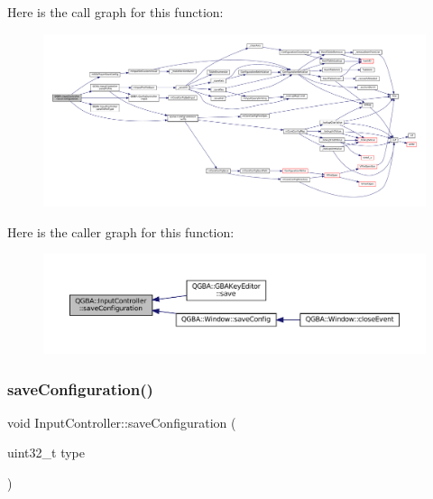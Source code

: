 Here is the call graph for this function\+:
\nopagebreak
\begin{figure}[H]
\begin{center}
\leavevmode
\includegraphics[width=350pt]{class_q_g_b_a_1_1_input_controller_a2adb9fc74465b49f0730fdcf034e05bd_cgraph}
\end{center}
\end{figure}
Here is the caller graph for this function\+:
\nopagebreak
\begin{figure}[H]
\begin{center}
\leavevmode
\includegraphics[width=350pt]{class_q_g_b_a_1_1_input_controller_a2adb9fc74465b49f0730fdcf034e05bd_icgraph}
\end{center}
\end{figure}
\mbox{\label{class_q_g_b_a_1_1_input_controller_a161357b346c5e579e79ad28c6b6c4686}} 
\subsubsection{\texorpdfstring{save\+Configuration()}{saveConfiguration()}\hspace{0.1cm}{\footnotesize\ttfamily [2/2]}}
{\footnotesize\ttfamily void Input\+Controller\+::save\+Configuration (\begin{DoxyParamCaption}\item[{uint32\+\_\+t}]{type }\end{DoxyParamCaption})}

